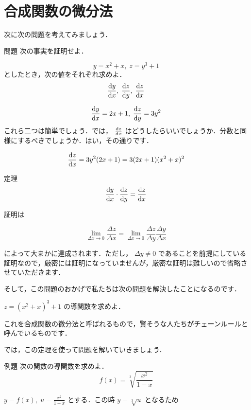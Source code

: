 \documentclass[
  b4paperpaper,
  xelatex,ja=standard]{bxjsbook}
\begin{document}
\hypertarget{ux5408ux6210ux95a2ux6570ux306eux5faeux5206ux6cd5}{%
\section{合成関数の微分法}\label{ux5408ux6210ux95a2ux6570ux306eux5faeux5206ux6cd5}}

次に次の問題を考えてみましょう．

\begin{Qbox}{問題}
次の事実を証明せよ．

\[y=x^2+x,\; z=y^3+1\] としたとき，次の値をそれぞれ求めよ．
\[\dv{y}{x},\;\dv{z}{y},\;\dv{z}{x}\]

\end{Qbox}

\[\dv{y}{x}=2x+1,\; \dv{z}{y}=3y^2\] これら二つは簡単でしょう．では，
\(\dv{z}{x}\)
はどうしたらいいでしょうか．分数と同様にするべきでしょうか．はい，その通りです．

\[\dv{z}{x}=3y^2(2x+1)=3(2x+1)(x^2+x)^2\]

\begin{Tbox}{定理}
\[\dv{y}{x}\cdot \dv{z}{y}=\dv{z}{x}\]

\end{Tbox}

証明は

\[\lim_{\Delta x \to 0}\frac{\Delta z}{\Delta x}=\lim_{\Delta x \to 0}\frac{\Delta z}{\Delta y}\frac{\Delta y}{\Delta x}\]

によって大まかに達成されます．ただし， \(\Delta y \neq 0\)
であることを前提にしている証明なので，厳密には証明になっていませんが，厳密な証明は難しいので省略させていただきます．

そして，この問題のおかげで私たちは次の問題を解決したことになるのです．

\(z=(x^2+x)^3+1\) の導関数を求めよ．

これを合成関数の微分法と呼ばれるもので，賢そうな人たちがチェーンルールと呼んでいるものです．

では，この定理を使って問題を解いていきましょう．

\begin{Rbox}{例題}
次の関数の導関数を求めよ． \[f(x)=\sqrt[3]{\frac{x^2}{1-x}}\]

\end{Rbox}


\(y=f(x),\; u=\frac{x^2}{1-x}\) とする．この時 \(y=\sqrt[3]{u}\)
となるため
\end{document}

